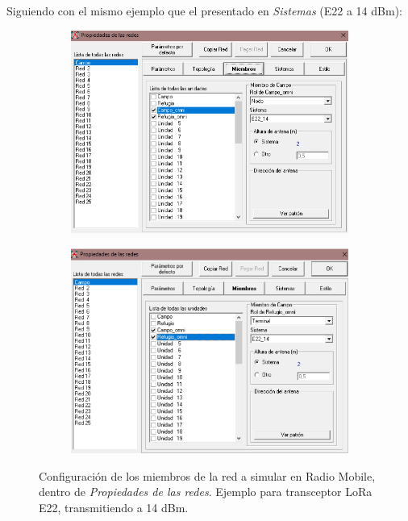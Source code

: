\documentclass[12pt]{article}
\begin{document}
\begin{itemize}
		\pagebreak
		
		Siguiendo con el mismo ejemplo que el presentado en \textit{Sistemas} (E22 a 14 dBm): \\
		
		\begin{figure}[h]
			\begin{subfigure}{0.5\textwidth}
				\includegraphics[width=1\textwidth]{img/propRedes_miembrosE2214_radioMobile.png} 
				\caption{}
				\label{fig: prop redes miembro nodo radio mobile}
			\end{subfigure}
			\begin{subfigure}{0.5\textwidth}
				\includegraphics[width=1\linewidth]{img/propRedes_miembroTerminalE2214_radioMobile.png}
				\caption{}
				\label{fig: prop redes miembro terminal radio mobile}
			\end{subfigure}
			\caption{Configuración de los miembros de la red a simular en Radio Mobile, dentro de \textit{Propiedades de las redes}. Ejemplo para transceptor LoRa E22, transmitiendo a 14 dBm.}
			\label{fig: prop redes miembros radio mobile}
		\end{figure}
		

\end{itemize}
\end{document}

